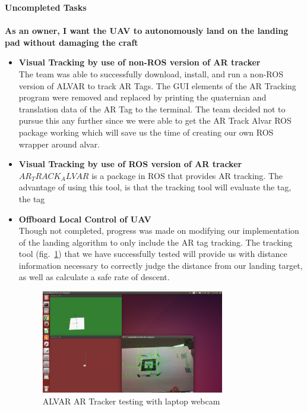 \vspace{5mm}
\noindent \Large{\textbf{Uncompleted Tasks}}\\
\vspace{2mm}\\
\noindent \large{\textbf{As an owner, I want the UAV to autonomously land on the landing pad without damaging the craft}}
\normalsize
\begin{itemize}
\item \textbf{Visual Tracking by use of non-ROS version of AR tracker}\\
The team was able to successfully download, install, and run a non-ROS version of ALVAR to track AR Tags. The GUI elements of the AR Tracking program were removed and replaced by printing the quaternian and translation data of the AR Tag to the terminal.
The team decided not to pursue this any further since we were able to get the AR Track Alvar ROS package working which will save us the time of creating our own ROS wrapper around alvar.

\item \textbf{Visual Tracking by use of ROS version of AR tracker}\\
$AR_TRACK_ALVAR$ is a package in ROS that provides AR tracking. The advantage of using this tool, is that the tracking tool will evaluate the tag, the tag 
\item \textbf{Offboard Local Control of UAV}\\
Though not completed, progress was made on modifying our implementation of the landing algorithm to only include the AR tag tracking. The tracking tool (fig.~\ref{fig:artracker}) that we have successfully tested will provide us with distance information necessary to correctly judge the distance from our landing target, as well as calculate a safe rate of descent.

\begin{figure}[h]
\includegraphics[width=8cm]{AlvarExample.png}
\centering
\caption{ALVAR AR Tracker testing with laptop webcam}
\label{fig:artracker}
\end{figure}

\end{itemize}


